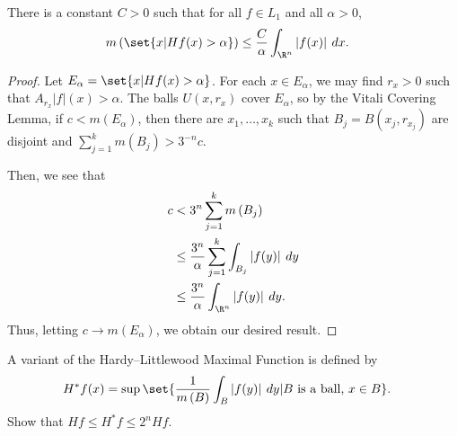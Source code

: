 \documentclass[10pt]{mypackage}
\begin{document}
\begin{theorem}
  There is a constant $C > 0$ such that for all $f\in L_1$ and all $\alpha > 0$,
  \begin{align*}
    m\left( \set{x | Hf(x) > \alpha} \right) &\leq \frac{C}{\alpha} \int_{\R^n}^{} \left\vert f(x) \right\vert\:dx.
  \end{align*}
\end{theorem}
\begin{proof}
  Let $E_{\alpha} = \set{x | Hf(x) > \alpha}$. For each $x\in E_{\alpha}$, we may find $r_x > 0$ such that $A_{r_x}\left\vert f \right\vert(x) > \alpha$. The balls $U\left( x,r_x \right)$ cover $E_{\alpha}$, so by the Vitali Covering Lemma, if $c < m\left( E_{\alpha} \right)$, then there are $x_1,\dots,x_k$ such that $B_j = B\left( x_j,r_{x_j} \right)$ are disjoint and $\sum_{j=1}^{k}m\left( B_j \right) > 3^{-n}c$.\newline

  Then, we see that
  \begin{align*}
    c &< 3^{n}\sum_{j=1}^{k} m\left( B_j \right)\\
      &\leq \frac{3^{n}}{\alpha} \sum_{j=1}^{k} \int_{B_j}^{} \left\vert f(y) \right\vert\:dy\\
      &\leq \frac{3^{n}}{\alpha} \int_{\R^{n}}^{} \left\vert f(y) \right\vert\:dy.
  \end{align*}
  Thus, letting $c \rightarrow m\left( E_{\alpha} \right)$, we obtain our desired result.
\end{proof}
\begin{exercise}
  A variant of the Hardy--Littlewood Maximal Function is defined by
  \begin{align*}
    H^{\ast}f(x) &= \sup\set{ \frac{1}{m\left( B \right)}\int_{B}^{} \left\vert f(y) \right\vert\:dy | B\text{ is a ball, }x\in B}.
  \end{align*}
  Show that $Hf \leq H^{\ast}f \leq 2^{n}Hf$.
\end{exercise}
\end{document}
